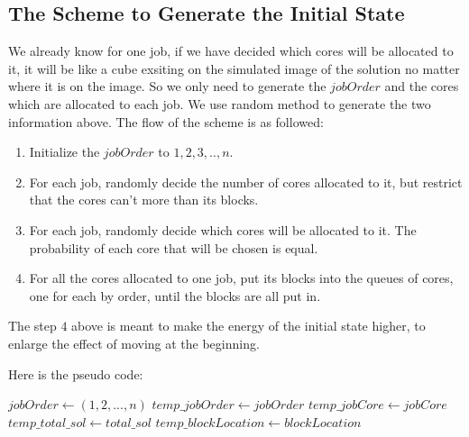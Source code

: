 \documentclass{llncs}
\begin{document}
	\subsection{The Scheme to Generate the Initial State} \label{subsec-initial}
	We already know for one job, if we have decided which cores will be allocated to it, it will be like a cube exsiting on the simulated image of the solution no matter where it is on the image. So we only need to generate the $jobOrder$ and the cores which are allocated to each job. 
	We use random method to generate the two information above. The flow of the scheme is as followed: 
	\begin{enumerate}
		\item Initialize the $jobOrder$ to $1,2,3,..,n$.
		\item For each job, randomly decide the number of cores allocated to it, but restrict that the cores can't more than its blocks.
		\item For each job, randomly decide which cores will be allocated to it. The probability of each core that will be chosen is equal. 
		\item For all the cores allocated to one job, put its blocks into the queues of cores, one for each by order, until the blocks are all put in. 
	\end{enumerate}

	The step $4$ above is meant to make the energy of the initial state higher, to enlarge the effect of moving at the beginning. 
	
	Here is the pseudo code: \\
	\begin{algorithm}[H]
		\BlankLine
		\caption{$init()$} \label{Alg-init}
		$jobOrder \leftarrow (1, 2, ..., n)$ \;
		$temp\_jobOrder \leftarrow jobOrder$ \;
		$temp\_jobCore \leftarrow jobCore$ \;
		$temp\_total\_sol \leftarrow total\_sol$ \;
		$temp\_blockLocation \leftarrow blockLocation$ \;
	\end{algorithm}
	
\end{document}
